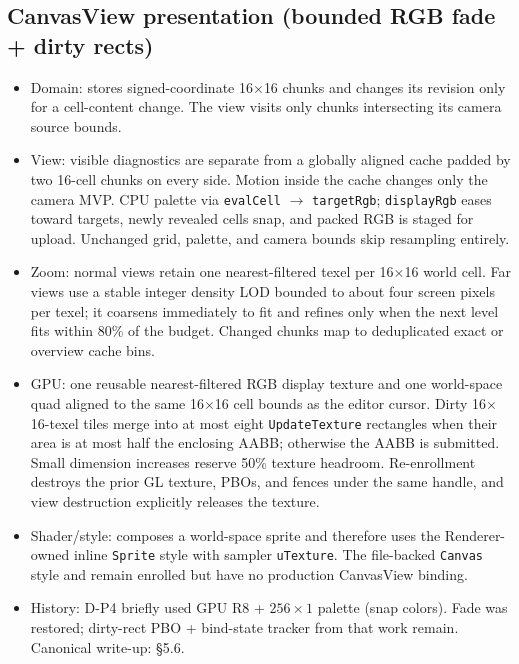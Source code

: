 \subsection{CanvasView presentation (bounded RGB fade + dirty rects)}
\label{sec:canvas-rgb-fade}
\begin{itemize}
  \item Domain:  stores signed-coordinate
        16$\times$16 chunks and changes its revision only for a cell-content
        change. The view visits only chunks intersecting its camera source
        bounds.
  \item View: visible diagnostics are separate from a globally aligned cache
        padded by two 16-cell chunks on every side. Motion inside the cache
        changes only the camera MVP. CPU palette via \texttt{evalCell}
        $\rightarrow$ \texttt{targetRgb};
        \texttt{displayRgb} eases toward targets, newly revealed cells snap,
        and packed RGB is staged for upload. Unchanged grid, palette, and
        camera bounds skip resampling entirely.
  \item Zoom: normal views retain one nearest-filtered texel per 16$\times$16
        world cell. Far views use a stable integer density LOD bounded to about
        four screen pixels per texel; it coarsens immediately to fit and refines
        only when the next level fits within 80\% of the budget. Changed chunks
        map to deduplicated exact or overview cache bins.
  \item GPU: one reusable nearest-filtered RGB display texture and one
        world-space quad aligned to the same 16$\times$16 cell bounds as the
        editor cursor. Dirty 16$\times$16-texel tiles merge into at most eight
        \texttt{UpdateTexture} rectangles when their area is at most half the
        enclosing AABB; otherwise the AABB is submitted. Small dimension
        increases reserve 50\% texture headroom. Re-enrollment destroys the
        prior GL texture, PBOs, and fences under the same handle, and view
        destruction explicitly releases the texture.
  \item Shader/style:  composes a world-space
         sprite and therefore uses the Renderer-owned
        inline \texttt{Sprite} style with sampler \texttt{uTexture}.
        The file-backed \texttt{Canvas} style and
         remain enrolled but have no production
        CanvasView binding.
  \item History: D-P4 briefly used GPU R8 + $256\times 1$ palette (snap colors).
        Fade was restored; dirty-rect PBO + bind-state tracker from that work
        remain. Canonical write-up:
         \S5.6.
\end{itemize}


